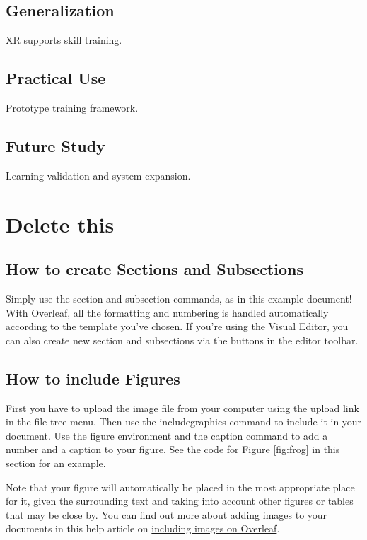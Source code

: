\documentclass[12pt]{article}
\begin{document}
\subsection{Generalization}
XR supports skill training.

\subsection{Practical Use}
Prototype training framework.

\subsection{Future Study}
Learning validation and system expansion.

\newpage
\section{Delete this}
\subsection{How to create Sections and Subsections}

Simply use the section and subsection commands, as in this example document! With Overleaf, all the formatting and numbering is handled automatically according to the template you've chosen. If you're using the Visual Editor, you can also create new section and subsections via the buttons in the editor toolbar.

\subsection{How to include Figures}

First you have to upload the image file from your computer using the upload link in the file-tree menu. Then use the includegraphics command to include it in your document. Use the figure environment and the caption command to add a number and a caption to your figure. See the code for Figure \ref{fig:frog} in this section for an example.

Note that your figure will automatically be placed in the most appropriate place for it, given the surrounding text and taking into account other figures or tables that may be close by. You can find out more about adding images to your documents in this help article on \href{https://www.overleaf.com/learn/how-to/Including_images_on_Overleaf}{including images on Overleaf}.
\end{document}
